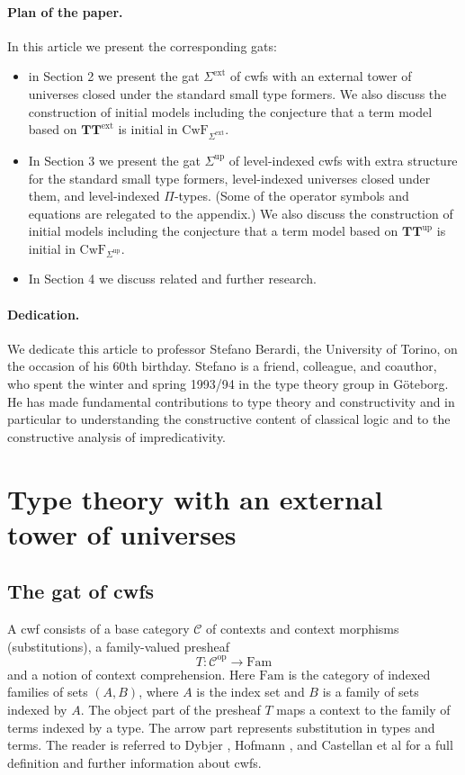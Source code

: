 \documentclass[11pt,a4paper]{article}
\theoremstyle{plain}
\theoremstyle{definition}
\newcommand{\op}{\mathrm{op}}
\def\CwF{\mathrm{CwF}}
\def\Fam{\mathrm{Fam}}
\def\C{\mathcal{C}}
\def\Sigmaext{{\Sigma^\mathrm{ext}}}
\def\Sigmaint{{\Sigma^\mathrm{up}}}
\def\TText{{\mathbf{TT}^\mathrm{ext}}}
\def\TTint{{\mathbf{TT}^\mathrm{up}}}
\begin{document}
\paragraph{Plan of the paper.}
In this article we present the corresponding gats:
\begin{itemize}
\item in Section 2 we present the gat $\Sigmaext$ of cwfs with an external tower of universes closed under the standard small type formers. We also discuss the construction of initial models including the conjecture that a term model based on $\TText$ is initial in $\CwF_\Sigmaext$.
\item In Section 3 we present the gat $\Sigmaint$ of level-indexed cwfs with extra structure for the standard small type formers, level-indexed universes closed under them, and level-indexed $\Pi$-types. (Some of the operator symbols and equations are relegated to the appendix.) We also discuss the construction of initial models including the conjecture that a term model based on $\TTint$ is initial in $\CwF_\Sigmaint$.
\item
In Section 4 we discuss related and further research.
\end{itemize}

\paragraph{Dedication.} We dedicate this article to professor Stefano Berardi, the University of Torino, on the occasion of his 60th birthday. Stefano is a friend, colleague, and coauthor, who spent the winter and spring 1993/94 in the type theory group in Göteborg. He has made fundamental contributions to type theory and constructivity and in particular to understanding the constructive content of classical logic and to the constructive analysis of impredicativity.

\section{Type theory with an external tower of universes}

\subsection{The gat of cwfs} A cwf consists of a base category $\C$ of contexts and context morphisms (substitutions), a family-valued presheaf
$$
T : \C^\op \to \Fam
$$
and a notion of context comprehension. Here $\Fam$ is the category of indexed families of sets $(A,B)$, where $A$ is the index set and $B$ is a family of sets indexed by $A$. The object part of the presheaf $T$ maps a context to the family of terms indexed by a type. The arrow part represents substitution in types and terms. The reader is referred to Dybjer \cite{dybjer:torino}, Hofmann \cite{hofmann:cambridge}, and Castellan et al \cite{castellan:lambek} for a full definition and further information about cwfs.
\end{document}
